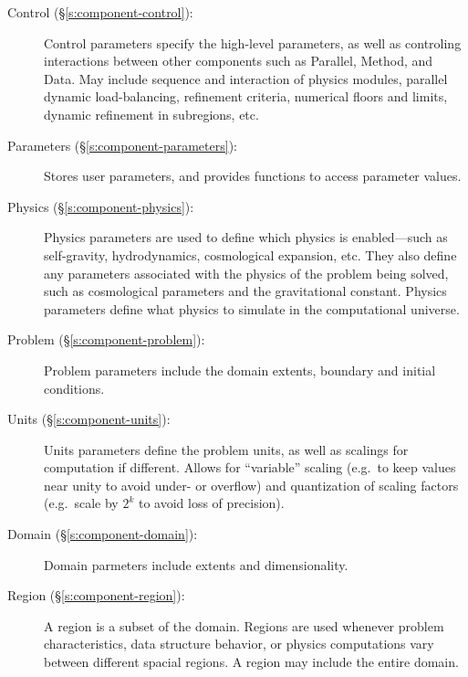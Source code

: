 \begin{description}

 \item [Control (\S\ref{s:component-control}): ] Control parameters specify the
 high-level parameters, as well as controling interactions between
 other components such as Parallel, Method, and Data.  May
 include sequence and interaction of physics modules, parallel dynamic
 load-balancing, refinement criteria, numerical floors and limits,
 dynamic refinement in subregions, etc.

 \item [Parameters (\S\ref{s:component-parameters}): ] Stores user parameters, and provides functions to access parameter values.

 \item [Physics (\S\ref{s:component-physics}): ] Physics parameters are used to
 define which physics is enabled---such as self-gravity,
 hydrodynamics, cosmological expansion, etc.  They also define any
 parameters associated with the physics of the problem being solved,
 such as cosmological parameters and the gravitational constant.
 Physics parameters define what physics to simulate in the
 computational universe.

 \item [Problem (\S\ref{s:component-problem}): ] Problem parameters include
 the domain extents, boundary and initial conditions.



 \item [Units (\S\ref{s:component-units}): ] Units parameters define the problem
 units, as well as scalings for computation if different.  Allows for
 ``variable'' scaling (e.g.~to keep values near unity to avoid under-
 or overflow) and quantization of scaling factors (e.g.~scale by $2^k$
 to avoid loss of precision).

 \item [Domain (\S\ref{s:component-domain}): ] Domain parmeters include extents
 and dimensionality.

 \item [Region (\S\ref{s:component-region}): ] A region is a subset of the
 domain.  Regions are used whenever problem characteristics,
 data structure behavior, or physics computations vary between
 different spacial regions.  A region may include the entire
 domain.


\end{description}
